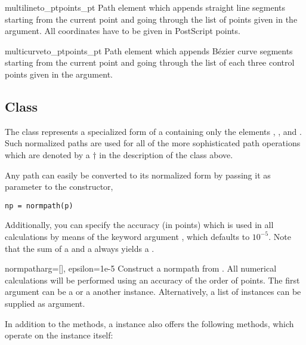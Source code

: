 \begin{classdesc}{multilineto_pt}{points_pt}
Path element which appends straight line segments starting from
the current point and going through the list of points given 
in the  argument. All coordinates have to 
be given in PostScript points.
\end{classdesc}

\begin{classdesc}{multicurveto_pt}{points_pt}
Path element which appends B\'ezier curve segments starting from
the current point and going through the list of each three control
points given in the  argument.
\end{classdesc}


\subsection{Class }

\label{path:normpath}

The  class represents a specialized form of a
 containing only the elements ,
,  and . Such normalized
paths are used for all of the more sophisticated path operations
which are denoted by a $\dagger$ in the description of the 
class above.

Any path can easily be converted to its normalized form by passing it
as parameter to the  constructor,
\begin{verbatim}
np = normpath(p)
\end{verbatim}
Additionally, you can specify the accuracy (in points) which is used
in all  calculations by means of the keyword argument
, which defaults to $10^{-5}$.  Note that the sum of a
 and a  always yields a .

\begin{classdesc}{normpath}{arg=[], epsilon=1e-5}
  Construct a normpath from . All numerical calculations will
  be performed using an accuracy of the order of  points.
  The first argument  can be a  or a another
   instance. Alternatively, a list of
   instances can be supplied as argument.
\end{classdesc}

In addition to the  methods, a  instance
also offers the following methods, which operate on the instance itself:

